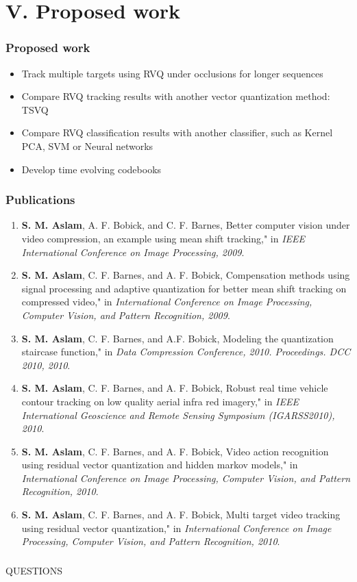\section{V. Proposed work}
\begin{frame}\frametitle{Proposed work}\logoCSIPCPL\mypagenum
	\begin{itemize}
		\item Track multiple targets using RVQ under occlusions for longer sequences
		\item Compare RVQ tracking results with another vector quantization method: TSVQ
		\item Compare RVQ classification results with another classifier, such as Kernel PCA, SVM or Neural networks
		\item Develop time evolving codebooks
	\end{itemize}
\end{frame}

\begin{frame}
\frametitle{Publications}
\logoCSIPCPL\mypagenum
	\begin{enumerate}\tiny
		\item \textbf{S. M. Aslam}, A. F. Bobick, and C. F. Barnes, Better computer vision under video compression, an example using mean shift tracking," in \emph{IEEE International Conference on Image Processing, 2009}.
		\item \textbf{S. M. Aslam}, C. F. Barnes, and A. F. Bobick, Compensation methods using signal processing and adaptive quantization for better mean shift tracking on compressed video," in \emph{International Conference on Image Processing, Computer Vision, and Pattern Recognition, 2009}.
		\item \textbf{S. M. Aslam}, C. F. Barnes, and A.F. Bobick, Modeling the quantization staircase function," in \emph{Data Compression Conference, 2010. Proceedings. DCC 2010, 2010}.
		\item \textbf{S. M. Aslam}, C. F. Barnes, and A. F. Bobick, Robust real time vehicle contour tracking on low quality aerial infra red imagery," in \emph{IEEE International Geoscience and Remote Sensing Symposium (IGARSS2010), 2010}.
		\item \textbf{S. M. Aslam}, C. F. Barnes, and A. F. Bobick, Video action recognition using residual vector quantization and hidden markov models," in \emph{International Conference on Image Processing, Computer Vision, and Pattern Recognition, 2010}.
		\item \textbf{S. M. Aslam}, C. F. Barnes, and A. F. Bobick, Multi target video tracking using residual vector quantization," in \emph{International Conference on Image Processing, Computer Vision, and Pattern Recognition, 2010}.
\end{enumerate}
\end{frame}


\begin{frame}
\frametitle{}
\logoCSIPCPL\mypagenum
		QUESTIONS
\end{frame}



